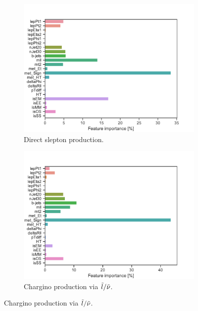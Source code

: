 \begin{figure}[H]
    \centering
    \begin{subfigure}[t!]{0.49\textwidth}
        \includegraphics[width = \textwidth]{Figures/SlepSlep/ML/BDT/All_level/Inter/featureImportance.pdf}
        \caption{Direct slepton production.}
        \label{fig:featSlepslepInter}
    \end{subfigure}
    \begin{subfigure}[t!]{0.49\textwidth}
        \includegraphics[width = \textwidth]{Figures/SlepSnu/BDT/All_level/Inter/featureImportance.pdf}
        \caption{Chargino production via $\Tilde{l}/\Tilde{\nu}$.}
        \label{fig:featSlepsnuInter}
    \end{subfigure}

\end{figure}
